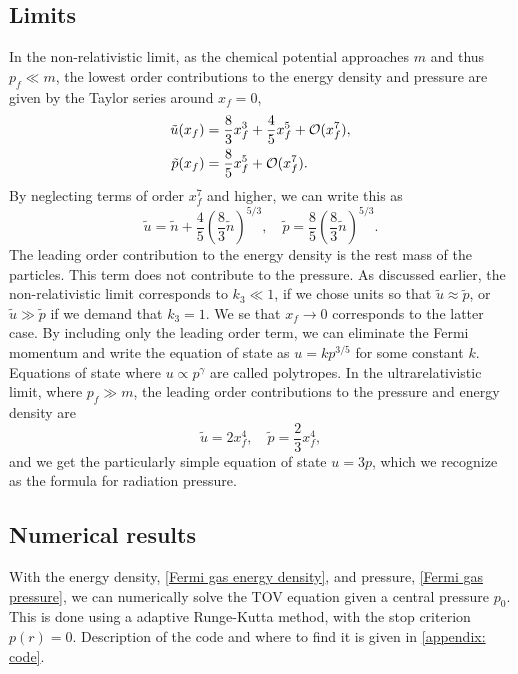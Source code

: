 \subsection*{Limits}

In the non-relativistic limit, as the chemical potential approaches $m$ and thus $p_f \ll m$, the lowest order contributions to the energy density and pressure are given by the Taylor series around $x_f = 0$,
%
\begin{align}
    \tilde u(x_f) &= \frac{8}{3}x_f^3 + \frac{4}{5} x_f^5 + \mathcal O(x_f^7),  \\
    \tilde p(x_f) &= \frac{8}{5}x_f^5 + \mathcal O(x_f^7).
\end{align}
%
By neglecting terms of order $x_f^7$ and higher, we can write this as
%
\begin{equation}
    \tilde u = \tilde n + \frac{4}{5} \left( \frac{8}{3} \tilde n \right)^{5/3},
    \quad
    \tilde p =  \frac{8}{5} \left( \frac{8}{3} \tilde n \right)^{5/3}.
\end{equation}
%
The leading order contribution to the energy density is the rest mass of the particles.
This term does not contribute to the pressure.
As discussed earlier, the non-relativistic limit corresponds to $k_3 \ll 1$, if we chose units so that $\tilde u \approx \tilde p$, or $\tilde u \gg \tilde p$ if we demand that $k_3 = 1$.
We se that $x_f \rightarrow 0$ corresponds to the latter case.
By including only the leading order term, we can eliminate the Fermi momentum and write the equation of state as $u = k p^{3/5}$ for some constant $k$.
Equations of state where $u \propto p^{\gamma}$ are called polytropes.
In the ultrarelativistic limit, where $p_f \gg m$, the leading order contributions to the pressure and energy density are
%
\begin{equation}
    \tilde u = 2 x_f^4, \quad \tilde p = \frac{2}{3} x_f^4, 
\end{equation}
%
and we get the particularly simple equation of state $ u = 3 p $, which we recognize as the formula for radiation pressure.


\subsection*{Numerical results}

With the energy density, \autoref{Fermi gas energy density}, and pressure, \autoref{Fermi gas pressure}, we can numerically solve the TOV equation given a central pressure $p_0$. 
This is done using a adaptive Runge-Kutta method, with the stop criterion $p(r) = 0$.
Description of the code and where to find it is given in \autoref{appendix: code}.

